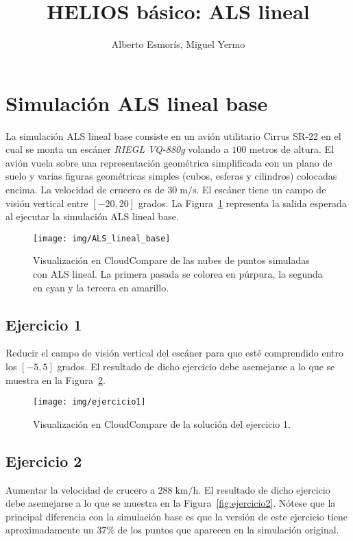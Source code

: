 \documentclass[]{article}
\title{HELIOS básico: ALS lineal}
\author{Alberto Esmorís, Miguel Yermo}
\date{}
\begin{document}
	
	\maketitle
	
	
	
	\section*{Simulación ALS lineal base}
	La simulación ALS lineal base consiste en un avión utilitario Cirrus SR-22 en el cual se monta un escáner \textit{RIEGL VQ-880g} volando a $100$ metros de altura. El avión vuela sobre una representación geométrica simplificada con un plano de suelo y varias figuras geométricas simples (cubos, esferas y cilindros) colocadas encima. La velocidad de crucero es de $30\;\text{m}/\text{s}$. El escáner tiene un campo de visión vertical entre $[-20, 20]$ grados. La Figura~\ref{fig:als_lineal_base} representa la salida esperada al ejecutar la simulación ALS lineal base.
	
	\begin{figure}[htb]
		\centering
		\texttt{[image: img/ALS\_lineal\_base]}
		\caption{Visualización en CloudCompare de las nubes de puntos simuladas con ALS lineal. La primera pasada se colorea en púrpura, la segunda en cyan y la tercera en amarillo.}
		\label{fig:als_lineal_base}
	\end{figure}


	\pagebreak
	

	\subsection*{Ejercicio 1}
	Reducir el campo de visión vertical del escáner para que esté comprendido entro los $[-5, 5]$ grados. El resultado de dicho ejercicio debe asemejarse a lo que se muestra en la Figura~\ref{fig:ejercicio1}.
	
	\begin{figure}[htb]
		\centering
		\texttt{[image: img/ejercicio1]}
		\caption{Visualización en CloudCompare de la solución del ejercicio 1.}
		\label{fig:ejercicio1}
	\end{figure}


	\subsection*{Ejercicio 2}
	Aumentar la velocidad de crucero a $288\;\text{km}/\text{h}$. El resultado de dicho ejercicio debe asemejarse a lo que se muestra en la Figura~\ref{fig:ejercicio2}. Nótese que la principal diferencia con la simulación base es que la versión de este ejercicio tiene aproximadamente un $37\%$ de los puntos que aparecen en la simulación original.
	
\end{document}
